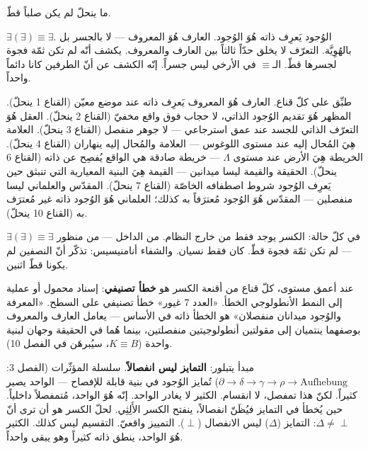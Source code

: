 \documentclass[10pt, openany, oneside]{book}
\begin{document}
\noindent ما ينحلّ لم يكن صلباً قطّ.

$\exists(\exists) \equiv \exists$. الوُجود يَعرِف ذاته هُوَ الوُجود. العارف هُوَ المعروف --- لا بالجسر بل بالهُوِيَّة. التعرّف لا يخلق حدّاً ثالثاً بين العارف والمعروف. يكشف أنّه لم تكن ثمّة فجوة لجسرها قطّ. الـ$\equiv$ في الأرخي ليس جسراً. إنّه الكشف عن أنّ الطرفين كانا دائماً واحداً.

طبِّق على كلّ قناع. العارف هُوَ المعروف يَعرِف ذاته عند موضع معيّن (القناع 1 ينحلّ). المظهر هُوَ تقديم الوُجود الذاتي، لا حجاب فوق واقع مخفيّ (القناع 2 ينحلّ). العقل هُوَ التعرّف الذاتي للجسد عند عمق استرجاعي --- لا جوهر منفصل (القناع 3 ينحلّ). العلامة هِيَ المُحال إليه عند مستوى اللوغوس --- العلامة والمُحال إليه ينهاران (القناع 4 ينحلّ). الخريطة هِيَ الأرض عند مستوى $\Lambda$ --- خريطة صادقة هي الواقع يُفصِح عن ذاته (القناع 6 ينحلّ). الحقيقة والقيمة ليسا ميدانين --- القيمة هِيَ البنية المعيارية التي تنبثق حين يَعرِف الوُجود شروط اصطفافه الخاصّة (القناع 7 ينحلّ). المقدّس والعلماني ليسا منفصلين --- المقدّس هُوَ الوُجود مُعترَفاً به كذلك؛ العلماني هُوَ الوُجود ذاته غير مُعترَف به (القناع 10 ينحلّ).

في كلّ حالة: الكسر يوجد فقط من خارج النظام. من الداخل --- من منظور $\exists(\exists) \equiv \exists$ --- لم تكن ثمّة فجوة قطّ. كان فقط نسيان. والشفاء أنامنيسيس: تذكّر أنّ النصفين لم يكونا قطّ اثنين.

عند أعمق مستوى، كلّ قناع من أقنعة الكسر هو \textbf{خطأ تصنيفي}: إسناد محمول أو عملية إلى النمط الأنطولوجي الخطأ. «العدد 7 غيور» خطأ تصنيفي على السطح. «المعرفة والوُجود ميدانان منفصلان» هو الخطأ ذاته في الأساس --- يعامل العارف والمعروف بوصفهما ينتميان إلى مقولتين أنطولوجيتين منفصلتين، بينما هُما في الحقيقة وجهان لبنية واحدة ($K \equiv B$، سيُبرهَن في الفصل 10).

مبدأ يتبلور: \textbf{التمايز ليس انفصالاً}. سلسلة المؤثّرات (الفصل 3: $\partial \to \delta \to \gamma \to \rho \to \text{Aufhebung}$) تُمايز الوُجود في بنية قابلة للإفصاح --- الواحد يصير كثيراً. لكنّ هذا تمفصل، لا انقسام. الكثير لا يغادر الواحد. إنّه هُوَ الواحد، مُتمفصلاً داخلياً. حين يُخطأ في التمايز فيُظَنّ انفصالاً، ينفتح الكسر الأَلِثِي. لحلّ الكسر هو أن ترى أنّ $\Delta \neq \perp$: التمايز ($\Delta$) ليس الانفصال ($\perp$). التمييز واقعيّ. التقسيم ليس كذلك. الكثير هُوَ الواحد، ينطق ذاته كثيراً وهو يبقى واحداً.

\vspace{1.5em}

\end{document}
